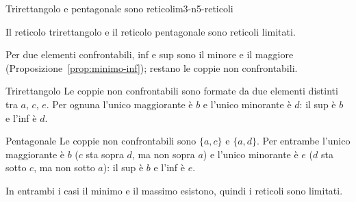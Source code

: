 
\begin{concetto}
\begin{Proposizione}{Trirettangolo e pentagonale sono reticoli}{m3-n5-reticoli}
    \begin{prerequisiti}
    \end{prerequisiti}
    Il reticolo trirettangolo e il reticolo pentagonale sono reticoli limitati.
\end{Proposizione}
\begin{dimostrazione}
    Per due elementi confrontabili, inf e sup sono il minore e il maggiore (Proposizione~\ref{prop:minimo-inf}); restano le coppie non confrontabili.
    \begin{caso}{Trirettangolo}
        Le coppie non confrontabili sono formate da due elementi distinti tra $a$, $c$, $e$. Per ognuna l'unico maggiorante è $b$ e l'unico minorante è $d$:
        il sup è $b$ e l'inf è $d$.
    \end{caso}
    \begin{caso}{Pentagonale}
        Le coppie non confrontabili sono $\{a, c\}$ e $\{a, d\}$. Per entrambe l'unico maggiorante è $b$ ($c$ sta sopra $d$, ma non sopra $a$) e l'unico
        minorante è $e$ ($d$ sta sotto $c$, ma non sotto $a$): il sup è $b$ e l'inf è $e$.
    \end{caso}
    In entrambi i casi il minimo e il massimo esistono, quindi i reticoli sono limitati.
\end{dimostrazione}
\end{concetto}

